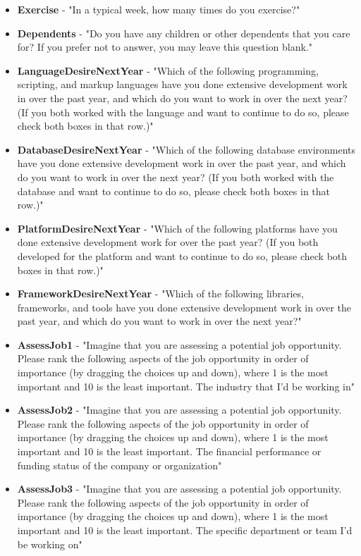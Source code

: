 \begin{appendices}
\begin{itemize}
        \item \textbf{Exercise} - "In a typical week, how many times do you exercise?"
        \item \textbf{Dependents} - "Do you have any children or other dependents that you care for? If you prefer not to answer, you may leave this question blank."
        \item \textbf{LanguageDesireNextYear} - "Which of the following programming, scripting, and markup languages have you done extensive development work in over the past year, and which do you want to work in over the next year?  (If you both worked with the language and want to continue to do so, please check both boxes in that row.)"
        \item \textbf{DatabaseDesireNextYear} - "Which of the following database environments have you done extensive development work in over the past year, and which do you want to work in over the next year?   (If you both worked with the database and want to continue to do so, please check both boxes in that row.)"
        \item \textbf{PlatformDesireNextYear} - "Which of the following platforms have you done extensive development work for over the past year?   (If you both developed for the platform and want to continue to do so, please check both boxes in that row.)"
        \item \textbf{FrameworkDesireNextYear} - "Which of the following libraries, frameworks, and tools have you done extensive development work in over the past year, and which do you want to work in over the next year?"
        \item \textbf{AssessJob1} - "Imagine that you are assessing a potential job opportunity. Please rank the following aspects of the job opportunity in order of importance (by dragging the choices up and down), where 1 is the most important and 10 is the least important. The industry that I'd be working in"
        \item \textbf{AssessJob2} - "Imagine that you are assessing a potential job opportunity. Please rank the following aspects of the job opportunity in order of importance (by dragging the choices up and down), where 1 is the most important and 10 is the least important. The financial performance or funding status of the company or organization"
        \item \textbf{AssessJob3} - "Imagine that you are assessing a potential job opportunity. Please rank the following aspects of the job opportunity in order of importance (by dragging the choices up and down), where 1 is the most important and 10 is the least important. The specific department or team I'd be working on"

\end{itemize}
\end{appendices}
